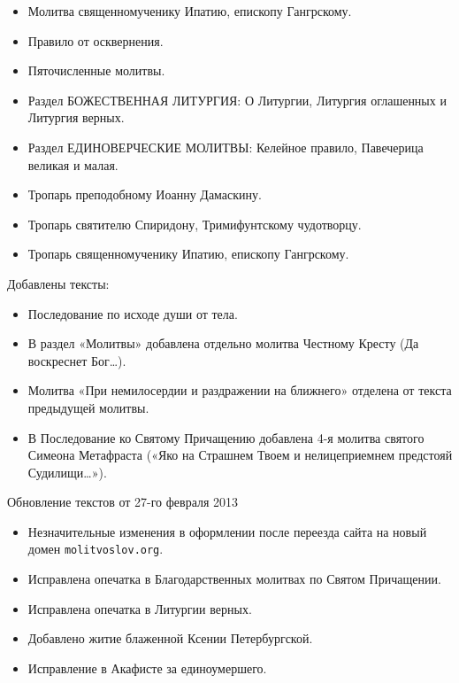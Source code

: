 \begin{itemize}
\item Молитва священномученику Ипатию, епископу Гангрскому.
\item Правило от осквернения.
\item Пяточисленные молитвы.
\item Раздел БОЖЕСТВЕННАЯ ЛИТУРГИЯ: О Литургии, Литургия оглашенных и Литургия верных.
\item Раздел ЕДИНОВЕРЧЕСКИЕ МОЛИТВЫ: Келейное правило, Павечерица великая и малая.
\item Тропарь преподобному Иоанну Дамаскину.
\item Тропарь святителю Спиридону, Тримифунтскому чудотворцу.
\item Тропарь священномученику Ипатию, епископу Гангрскому.

\end{itemize}

Добавлены тексты:

\begin{itemize}

\item Последование по исходе души от тела.
\item В раздел «Молитвы» добавлена отдельно молитва Честному Кресту (Да воскреснет Бог\ldots).
\item Молитва «При немилосердии и раздражении на ближнего» отделена от текста предыдущей молитвы.
\item В Последование ко Святому Причащению добавлена 4-я молитва святого Симеона Метафраста («Яко на Страшнем Твоем и нелицеприемнем предстояй Судилищи\ldots»).

\end{itemize}


Обновление текстов от 27-го февраля 2013

\begin{itemize}

\item Незначительные изменения в оформлении после переезда сайта на новый домен \texttt{molitvoslov.org}.
\item Исправлена опечатка в Благодарственных молитвах по Святом Причащении.
\item Исправлена опечатка в Литургии верных.
\item Добавлено житие блаженной Ксении Петербургской.
\item Исправление в Акафисте за единоумершего.

\end{itemize}

